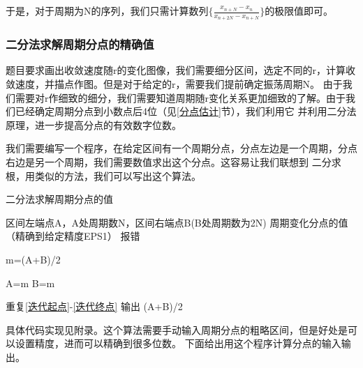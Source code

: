 \documentclass[10pt, a4paper]{article}
\begin{document}
    于是，对于周期为N的序列，我们只需计算数列$\{\frac{x_{n+N}-x_n}{x_{n+2N}-x_{n+N}}\}$的极限值即可。

    \subsubsection{二分法求解周期分点的精确值}

    题目要求画出收敛速度随r的变化图像，我们需要细分区间，选定不同的r，计算收敛速度，并描点作图。但是对于给定的r，需要我们提前确定振荡周期N。
    由于我们需要对r作细致的细分，我们需要知道周期随r变化关系更加细致的了解。由于我们已经确定周期分点到小数点后4位（见\ref{分点估计}节），我们利用它
    并利用二分法原理，进一步提高分点的有效数字位数。

    我们需要编写一个程序，在给定区间有一个周期分点，分点左边是一个周期，分点右边是另一个周期，我们需要数值求出这个分点。这容易让我们联想到
    二分求根，用类似的方法，我们可以写出这个算法。

    \begin{algorithm}[H]  
        \caption{ 二分法求解周期分点的值}  
        \label{二分法求解周期分点的精确值}  
        \begin{algorithmic}[1]  
        \Require  
            区间左端点A，A处周期数N，区间右端点B(B处周期数为2N)  
        \Ensure  
            周期变化分点的值（精确到给定精度EPS1）
            \State 报错
        \EndIf
                    
        \State m=(A+B)/2 \label{迭代起点} 
        
            \State A=m
        \Else
            \State B=m
        \EndIf\label{迭代终点}

            \State 重复\ref{迭代起点}-\ref{迭代终点}
        \Else
            \State 输出 (A+B)/2
        \EndIf
        \end{algorithmic}  
      \end{algorithm}  

    具体代码实现见附录。这个算法需要手动输入周期分点的粗略区间，但是好处是可以设置精度，进而可以精确到很多位数。
    下面给出用这个程序计算分点的输入输出。
\end{document}
